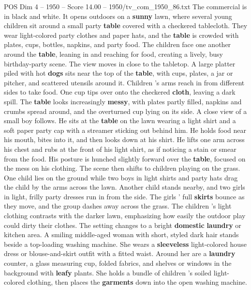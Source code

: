 \begin{textsample}{POS Dim 4 – 1950 – Score 14.00 – 1950/tv\_com\_1950\_86.txt}  \label{ex:f4_pos_037}
The commercial is in black and white.
It opens outdoors on a \textbf{sunny} lawn, where several young children sit around a small party \textbf{table} covered with a checkered tablecloth.
They wear light-colored party clothes and paper hats, and the \textbf{table} is crowded with plates, cups, bottles, napkins, and party food.
The children face one another around the \textbf{table}, leaning in and reaching for food, creating a lively, busy birthday-party scene.
The view moves in close to the tabletop.
A large platter piled with hot \textbf{dogs} sits near the top of the \textbf{table}, with cups, plates, a jar or pitcher, and scattered utensils around it.
Children ’s arms reach in from different sides to take food.
One cup tips over onto the checkered \textbf{cloth}, leaving a dark spill.
The \textbf{table} looks increasingly \textbf{messy}, with plates partly filled, napkins and crumbs spread around, and the overturned cup lying on its side.
A close view of a small boy follows.
He sits at the \textbf{table} on the lawn wearing a light shirt and a soft paper party cap with a streamer sticking out behind him.
He holds food near his mouth, bites into it, and then looks down at his shirt.
He lifts one arm across his chest and rubs at the front of his light shirt, as if noticing a stain or smear from the food.
His posture is hunched slightly forward over the \textbf{table}, focused on the mess on his clothing.
The scene then shifts to children playing on the grass.
One child lies on the ground while two boys in light shirts and party hats drag the child by the arms across the lawn.
Another child stands nearby, and two girls in light, frilly party dresses run in from the side.
The girls ’ full \textbf{skirts} bounce as they move, and the group dashes away across the grass.
The children ’s light clothing contrasts with the darker lawn, emphasizing how easily the outdoor play could dirty their clothes.
The setting changes to a bright \textbf{domestic} \textbf{laundry} or kitchen area.
A smiling middle-aged woman with short, styled dark hair stands beside a top-loading washing machine.
She wears a \textbf{sleeveless} light-colored house dress or blouse-and-skirt outfit with a fitted waist.
Around her are a \textbf{laundry} counter, a glass measuring cup, folded fabrics, and shelves or windows in the background with \textbf{leafy} plants.
She holds a bundle of children ’s soiled light-colored clothing, then places the \textbf{garments} down into the open washing machine.

\end{textsample}
